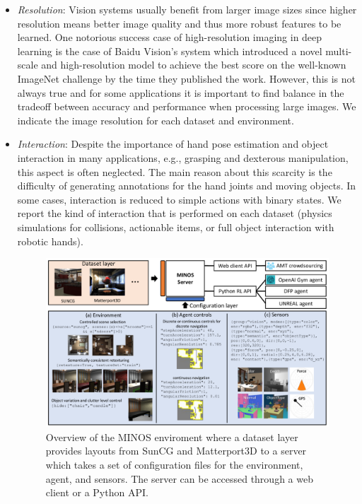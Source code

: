 \begin{itemize}
\begin{figure}[!htb]
    \label{fig:sim2real:ai2thor}
  \end{figure}
  \item \emph{Resolution}: Vision systems usually benefit from larger image sizes since higher resolution means better image quality and thus more robust features to be learned. One notorious success case of high-resolution imaging in deep learning is the case of Baidu Vision's system \cite{Wu2015b} which introduced a novel multi-scale and high-resolution model to achieve the best score on the well-known ImageNet challenge \cite{Russakovsky2015} by the time they published the work. However, this is not always true and for some applications it is important to find balance in the tradeoff between accuracy and performance when processing large images. We indicate the image resolution for each dataset and environment.
  \item \emph{Interaction}: Despite the importance of hand pose estimation and object interaction in many applications, e.g., grasping and dexterous manipulation, this aspect is often neglected. The main reason about this scarcity is the difficulty of generating annotations for the hand joints and moving objects. In some cases, interaction is reduced to simple actions with binary states. We report the kind of interaction that is performed on each dataset (physics simulations for collisions, actionable items, or full object interaction with robotic hands).
  \begin{figure}[!htb]
    \centering
    \includegraphics[width=\linewidth]{Figures/Sim2Real/minos}
    \caption{Overview of the MINOS enviroment where a dataset layer provides layouts from SunCG and Matterport3D to a server which takes a set of configuration files for the environment, agent, and sensors. The server can be accessed through a web client or a Python \ac{API}.}

\end{figure}
\end{itemize}
